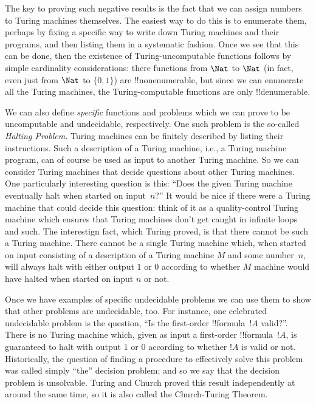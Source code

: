\documentclass[../../../include/open-logic-section]{subfiles}
\begin{document}
The key to proving such negative results is the fact that we can
assign numbers to Turing machines themselves.  The easiest way to do
this is to enumerate them, perhaps by fixing a specific way to write
down Turing machines and their programs, and then listing them in a
systematic fashion.  Once we see that this can be done, then the
existence of Turing-uncomputable functions follows by simple
cardinality considerations: there functions from $\Nat$ to $\Nat$ (in
fact, even just from $\Nat$ to $\{0, 1\}$) are !!{nonenumerable}, but
since we can enumerate all the Turing machines, the Turing-computable
functions are only !!{denumerable}.

We can also define \emph{specific} functions and problems which we can
prove to be uncomputable and undecidable, respectively.  One such
problem is the so-called \emph{Halting Problem.} Turing machines can
be finitely described by listing their instructions.  Such a
description of a Turing machine, i.e., a Turing machine program, can
of course be used as input to another Turing machine.  So we can
consider Turing machines that decide questions about other Turing
machines.  One particularly interesting question is this: ``Does the
given Turing machine eventually halt when started on input~$n$?''  It
would be nice if there were a Turing machine that could decide this
question: think of it as a quality-control Turing machine which
ensures that Turing machines don't get caught in infinite loops and
such.  The interestign fact, which Turing proved, is that there cannot
be such a Turing machine. There cannot be a single Turing machine
which, when started on input consisting of a description of a Turing
machine $M$ and some number~$n$, will always halt with either output
$1$ or $0$ according to whether $M$ machine would have halted when
started on input $n$ or not.

Once we have examples of specific undecidable problems we can use them
to show that other problems are undecidable, too.  For instance, one
celebrated undecidable problem is the question, ``Is the first-order
!!{formula}~$!A$ valid?''.  There is no Turing machine which, given as
input a first-order !!{formula}~$!A$, is guaranteed to halt with
output $1$ or $0$ according to whether $!A$ is valid or not.
Historically, the question of finding a procedure to effectively solve
this problem was called simply ``the'' decision problem; and so we say
that the decision problem is unsolvable.  Turing and Church proved this
result independently at around the same time, so it is also called the
Church-Turing Theorem.
\end{document}
